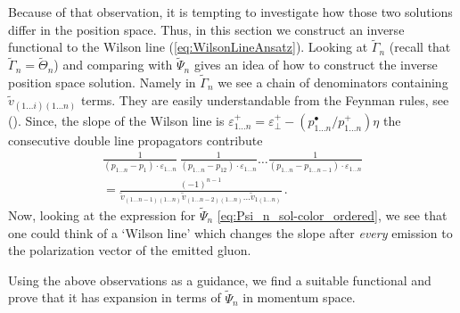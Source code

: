 \documentclass[english,american]{article}
\begin{document}
Because of that observation, it is tempting to investigate how those
two  solutions differ in the position space. Thus,
in this section we construct an inverse functional to the Wilson line
(\ref{eq:WilsonLineAnsatz}). Looking at $\tilde{\Gamma}_{n}$ (recall
that $\tilde{\Gamma}_{n}=\tilde{\Theta}_{n}$) and comparing with
$\tilde{\Psi}_{n}$ gives an idea of how to construct the inverse
position space solution. Namely in $\tilde{\Gamma}_{n}$ we see a
chain of denominators containing $\tilde{v}_{\left(1\dots i\right)\left(1\dots n\right)}$
terms. They are easily understandable from the Feynman rules, see ().
Since, the slope of the Wilson line is $\varepsilon_{1\dots n}^{+}=\varepsilon_{\perp}^{+}-\left(p_{1\dots n}^{\bullet}/p_{1\dots n}^{+}\right)\eta$
the consecutive double line propagators contribute 
\begin{multline}
\frac{1}{\left(p_{1\dots n}-p_{1}\right)\cdot\varepsilon_{1\dots n}}\,\frac{1}{\left(p_{1\dots n}-p_{12}\right)\cdot\varepsilon_{1\dots n}}\dots\frac{1}{\left(p_{1\dots n}-p_{1\dots n-1}\right)\cdot\varepsilon_{1\dots n}}\\
=\frac{\left(-1\right)^{n-1}}{\tilde{v}_{\left(1\dots n-1\right)\left(1\dots n\right)}\tilde{v}_{\left(1\dots n-2\right)\left(1\dots n\right)}\dots\tilde{v}_{1\left(1\dots n\right)}}\,.
\end{multline}
Now, looking at the expression for $\tilde{\Psi}_{n}$ \eqref{eq:Psi_n_sol-color_ordered}, we see that one could think of
a `Wilson line' which changes the slope after \textit{every} emission
to the polarization vector of the emitted gluon. 

Using the above observations as a guidance, we find a suitable functional
and prove that it has expansion in terms of $\tilde{\Psi}_{n}$ in
momentum space.
\end{document}

